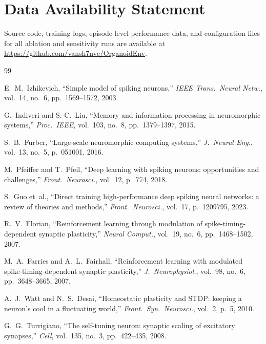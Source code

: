\documentclass[journal,twocolumn]{IEEEtran}
\begin{document}
\section*{Data Availability Statement}

Source code, training logs, episode-level performance data, and
configuration files for all ablation and sensitivity runs are available
at \url{https://github.com/vansh7nvc/OrganoidEnv}.

\begin{thebibliography}{99}

E.~M.~Izhikevich, ``Simple model of spiking neurons,'' \emph{IEEE
Trans.\ Neural Netw.}, vol.~14, no.~6, pp.~1569--1572, 2003.

G.~Indiveri and S.-C.~Liu, ``Memory and information processing in
neuromorphic systems,'' \emph{Proc.\ IEEE}, vol.~103, no.~8,
pp.~1379--1397, 2015.

S.~B.~Furber, ``Large-scale neuromorphic computing systems,''
\emph{J.\ Neural Eng.}, vol.~13, no.~5, p.~051001, 2016.

M.~Pfeiffer and T.~Pfeil, ``Deep learning with spiking neurons:
opportunities and challenges,'' \emph{Front.\ Neurosci.}, vol.~12,
p.~774, 2018.

S.~Guo et~al., ``Direct training high-performance deep spiking neural
networks: a review of theories and methods,'' \emph{Front.\
Neurosci.}, vol.~17, p.~1209795, 2023.

R.~V.~Florian, ``Reinforcement learning through modulation of
spike-timing-dependent synaptic plasticity,'' \emph{Neural Comput.},
vol.~19, no.~6, pp.~1468--1502, 2007.

M.~A.~Farries and A.~L.~Fairhall, ``Reinforcement learning with
modulated spike-timing-dependent synaptic plasticity,''
\emph{J.\ Neurophysiol.}, vol.~98, no.~6, pp.~3648--3665, 2007.

A.~J.~Watt and N.~S.~Desai, ``Homeostatic plasticity and STDP:
keeping a neuron's cool in a fluctuating world,''
\emph{Front.\ Syn.\ Neurosci.}, vol.~2, p.~5, 2010.

G.~G.~Turrigiano, ``The self-tuning neuron: synaptic scaling of
excitatory synapses,'' \emph{Cell}, vol.~135, no.~3,
pp.~422--435, 2008.


\end{thebibliography}
\end{document}
